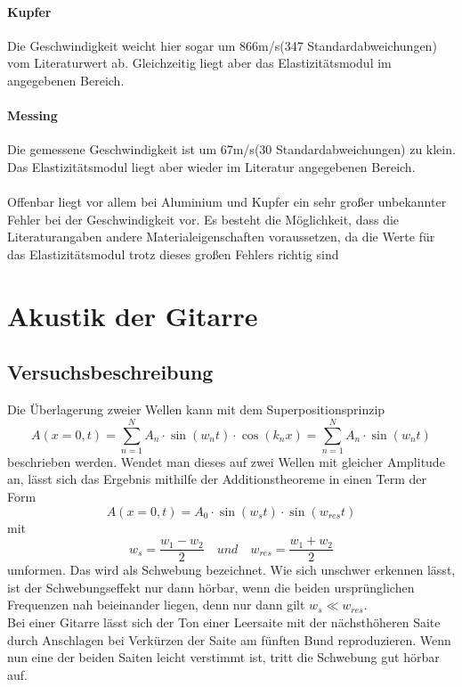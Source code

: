 \documentclass[12pt,a4paper]{article}
\begin{document}
\paragraph{Kupfer}
Die Geschwindigkeit weicht hier sogar um 866m/s(347 Standardabweichungen) vom Literaturwert ab. Gleichzeitig liegt aber das Elastizitätsmodul im angegebenen Bereich.
\paragraph{Messing}
Die gemessene Geschwindigkeit ist um 67m/s(30 Standardabweichungen) zu klein.
Das Elastizitätsmodul liegt aber wieder im Literatur angegebenen Bereich.
\\\\
Offenbar liegt vor allem bei Aluminium und Kupfer ein sehr großer unbekannter Fehler bei der Geschwindigkeit vor. Es besteht die Möglichkeit, dass die Literaturangaben andere Materialeigenschaften voraussetzen, da die Werte für das Elastizitätsmodul trotz dieses großen Fehlers richtig sind
\newpage


\section{Akustik der Gitarre}
\subsection{Versuchsbeschreibung}
Die Überlagerung zweier Wellen kann mit dem Superpositionsprinzip
\begin{equation}
A(x = 0, t) = \sum_{n=1}^N A_n \cdot \sin (w_nt) \cdot \cos (k_nx) = \sum_{n=1}^N A_n \cdot \sin (w_nt)
\end{equation}
beschrieben werden. Wendet man dieses auf zwei Wellen mit gleicher Amplitude an, lässt sich das Ergebnis mithilfe der Additionstheoreme in einen Term der Form
\begin{equation}
A(x = 0, t) = A_0 \cdot \sin (w_st) \cdot \sin (w_{res}t)
\end{equation}
mit
\begin{equation}
w_s = \dfrac{w_1 - w_2}{2} \quad und \quad w_{res} = \dfrac{w_1 + w_2}{2}
\label{eq:Schwebungsfrequenz}
\end{equation}
umformen. Das wird als Schwebung bezeichnet. Wie sich unschwer erkennen lässt, ist der Schwebungseffekt nur dann hörbar, wenn die beiden ursprünglichen Frequenzen nah beieinander liegen, denn nur dann gilt $w_s \ll w_{res}$. \\
Bei einer Gitarre lässt sich der Ton einer Leersaite mit der nächsthöheren Saite durch Anschlagen bei Verkürzen der Saite am fünften Bund reproduzieren. Wenn nun eine der beiden Saiten leicht verstimmt ist, tritt die Schwebung gut hörbar auf.
\end{document}
